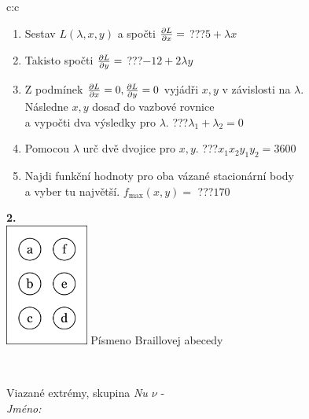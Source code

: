 \documentclass[10pt]{report}
\begin{document}
\begin{tabular}{c:c}
\begin{minipage}[c][104.5mm][t]{0.5\linewidth}
\begin{center}
\begin{minipage}{0.79\linewidth}
\begin{center}
\begin{varwidth}{\linewidth}
\begin{enumerate}
\item Sestav $L(\lambda,x,y)$ a spočti $\pdv{L}{x}=$\quad \dotfill\; ???\;\dotfill \quad $5+\lambda x$
\item Takisto spočti $\pdv{L}{y}=$\quad \dotfill\; ???\;\dotfill \quad $-12+2\lambda y$
\item Z podmínek $\pdv{L}{x}=0 , \pdv{L}{y}=0$ vyjádři $x,y$ v závislosti na $\lambda$.\\ \phantom{xxxxxx}Následne $x,y$ dosaď do vazbové rovnice\\ \phantom{xxxxxx}a vypočti dva výsledky pro $\lambda$.\quad \dotfill\; ???\;\dotfill \quad $\lambda_1+\lambda_2=0$
\item Pomocou $\lambda$ urč dvě dvojice pro $x,y$.\quad \dotfill\; ???\;\dotfill \quad $x_1 x_2 y_1 y_2=3600$
\item Najdi funkční hodnoty pro oba vázané stacionární body\\ \phantom{xxxxxx}a vyber tu najvětší. $f_{\text{max}}(x,y)=$\quad \dotfill\; ???\;\dotfill \quad $170$
\end{enumerate}
\end{varwidth}
\end{center}
\end{minipage}
\begin{minipage}{0.20\linewidth}
\begin{center}
{\Huge\bfseries 2.} \\[2mm]
\includegraphics[height=40mm]{../images/braille.png}
{\small Písmeno Braillovej abecedy}
\end{center}
\end{minipage}
\end{center}
\end{minipage}
\\ \hdashline
\begin{minipage}[c][104.5mm][t]{0.5\linewidth}
\begin{center}
\vspace{7mm}
{\huge Viazané extrémy, skupina \textit{Nu $\nu$} -}\\[5mm]
\textit{Jméno:}\phantom{xxxxxxxxxxxxxxxxxxxxxxxxxxxxxxxxxxxxxxxxxxxxxxxxxxxxxxxxxxxxxxxxx}\\[5mm]

\end{center}
\end{minipage}
\end{tabular}
\end{document}
